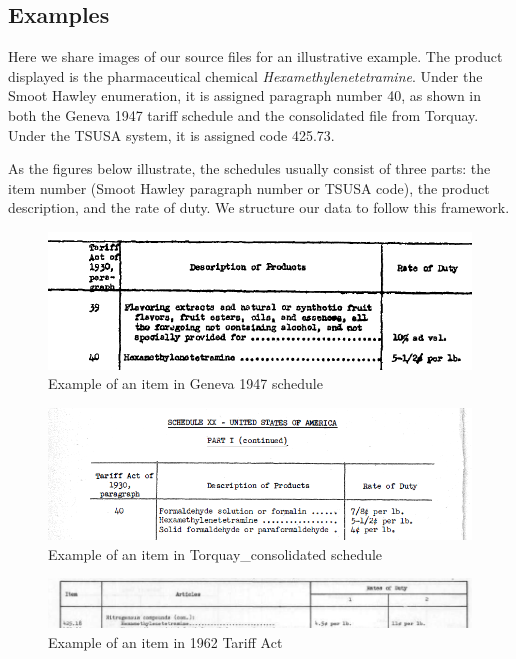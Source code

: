 \documentclass[
  12pt,
]{article}
\begin{document}
\newpage

\hypertarget{examples}{%
\subsection{Examples}\label{examples}}

Here we share images of our source files for an illustrative example. The product displayed is the pharmaceutical chemical \emph{Hexamethylenetetramine}. Under the Smoot Hawley enumeration, it is assigned paragraph number 40, as shown in both the Geneva 1947 tariff schedule and the consolidated file from Torquay. Under the TSUSA system, it is assigned code 425.73.

As the figures below illustrate, the schedules usually consist of three parts: the item number (Smoot Hawley paragraph number or TSUSA code), the product description, and the rate of duty. We structure our data to follow this framework.

\begin{figure}
\centering
\includegraphics{Geneva47.png}
\caption{Example of an item in Geneva 1947 schedule}
\end{figure}

\begin{figure}
\centering
\includegraphics{Torquay.png}
\caption{Example of an item in Torquay\_consolidated schedule}
\end{figure}

\begin{figure}
\centering
\includegraphics{TSUSA.png}
\caption{Example of an item in 1962 Tariff Act}
\end{figure}
\end{document}
